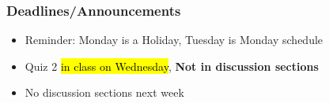 
\begin{frame}
    \frametitle{Deadlines/Announcements}
\begin{itemize}
            \item Reminder: Monday is a Holiday, Tuesday is Monday schedule
            \item Quiz 2 \hl{in class on Wednesday}, \textbf{Not in discussion sections}
            \item No discussion sections next week
        \end{itemize}
\end{frame}
